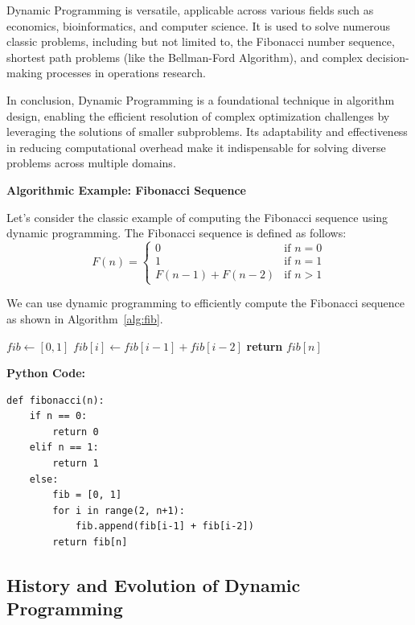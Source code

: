 \documentclass[12pt]{book} %
\begin{document}
Dynamic Programming is versatile, applicable across various fields such as economics, bioinformatics, and computer science. It is used to solve numerous classic problems, including but not limited to, the Fibonacci number sequence, shortest path problems (like the Bellman-Ford Algorithm), and complex decision-making processes in operations research.

In conclusion, Dynamic Programming is a foundational technique in algorithm design, enabling the efficient resolution of complex optimization challenges by leveraging the solutions of smaller subproblems. Its adaptability and effectiveness in reducing computational overhead make it indispensable for solving diverse problems across multiple domains.


\FloatBarrier
\textbf{Algorithmic Example: Fibonacci Sequence}

Let's consider the classic example of computing the Fibonacci sequence using dynamic programming. The Fibonacci sequence is defined as follows:
\[
F(n) =
\begin{cases}
0 & \text{if } n=0 \\
1 & \text{if } n=1 \\
F(n-1) + F(n-2) & \text{if } n > 1
\end{cases}
\]

We can use dynamic programming to efficiently compute the Fibonacci sequence as shown in Algorithm~\ref{alg:fib}. 
\FloatBarrier
\begin{algorithm}
\caption{Dynamic Programming for Fibonacci Sequence}
\label{alg:fib}
\begin{algorithmic}[1]
\State $fib \gets [0, 1]$
\State $fib[i] \gets fib[i-1] + fib[i-2]$
\EndFor
\State \textbf{return} $fib[n]$
\EndFunction
\end{algorithmic}
\end{algorithm}
\FloatBarrier
\textbf{Python Code:}
\FloatBarrier
\begin{lstlisting}
def fibonacci(n):
    if n == 0:
        return 0
    elif n == 1:
        return 1
    else:
        fib = [0, 1]
        for i in range(2, n+1):
            fib.append(fib[i-1] + fib[i-2])
        return fib[n]
\end{lstlisting}
\FloatBarrier

\subsection{History and Evolution of Dynamic Programming}
\end{document}
